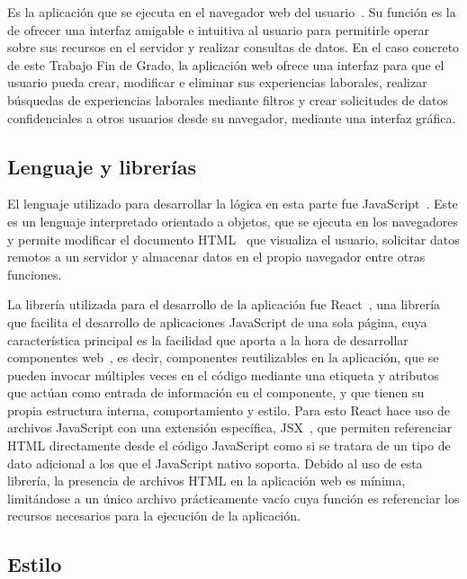 \documentclass[a4paper, 12pt]{book}
\begin{document}
    Es la aplicación que se ejecuta en el navegador web del usuario~\cite{bib:webapp}. Su función es la de ofrecer una interfaz amigable e intuitiva al usuario para permitirle operar sobre sus recursos en el servidor y realizar consultas de datos.
    En el caso concreto de este Trabajo Fin de Grado, la aplicación web ofrece una interfaz para que el usuario pueda crear, modificar e eliminar sus experiencias laborales, realizar búsquedas de experiencias laborales mediante filtros
    y crear solicitudes de datos confidenciales a otros usuarios desde su navegador, mediante una interfaz gráfica.

    \subsection{Lenguaje y librerías}
    \label{subsec:intro_webapplication_languageandlibraries}

    El lenguaje utilizado para desarrollar la lógica en esta parte fue JavaScript~\cite{bib:javascript}. Este es un lenguaje interpretado orientado a objetos, que se ejecuta en los navegadores y permite modificar el documento HTML~\cite{bib:html} que visualiza el usuario, solicitar datos remotos a un servidor y almacenar datos en el propio navegador entre otras funciones.

    La librería utilizada para el desarrollo de la aplicación fue React~\cite{react}, una librería que facilita el desarrollo de aplicaciones JavaScript de una sola página, cuya característica principal es la facilidad que aporta a la hora de desarrollar componentes web~\cite{bib:webcomponents}, es decir,
    componentes reutilizables en la aplicación, que se pueden invocar múltiples veces en el código mediante una etiqueta y atributos que actúan como entrada de información en el componente, y que tienen su propia estructura interna, comportamiento y estilo.
    Para esto React hace uso de archivos JavaScript con una extensión específica, JSX~\cite{bib:jsx}, que permiten referenciar HTML directamente desde el código JavaScript como si se tratara de un tipo de dato adicional a los que el JavaScript nativo soporta.
    Debido al uso de esta librería, la presencia de archivos HTML en la aplicación web es mínima, limitándose a un único archivo prácticamente vacío cuya función es referenciar los recursos necesarios para la ejecución de la aplicación.

    \subsection{Estilo}
    \label{subsec:intro_webapplication_style}
\end{document}
